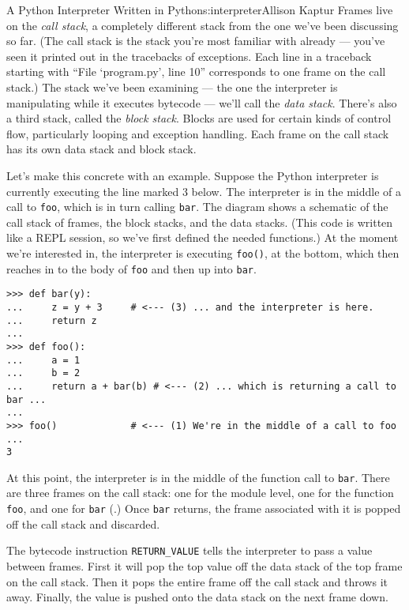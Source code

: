 \begin{aosachapter}{A Python Interpreter Written in Python}{s:interpreter}{Allison Kaptur}
Frames live on the \emph{call stack}, a completely different stack from
the one we've been discussing so far. (The call stack is the stack
you're most familiar with already --- you've seen it printed out in the
tracebacks of exceptions. Each line in a traceback starting with ``File
`program.py', line 10'' corresponds to one frame on the call stack.) The
stack we've been examining --- the one the interpreter is manipulating
while it executes bytecode --- we'll call the \emph{data stack}. There's
also a third stack, called the \emph{block stack}. Blocks are used for
certain kinds of control flow, particularly looping and exception
handling. Each frame on the call stack has its own data stack and block
stack.

Let's make this concrete with an example. Suppose the Python interpreter
is currently executing the line marked 3 below. The interpreter is in
the middle of a call to \texttt{foo}, which is in turn calling
\texttt{bar}. The diagram shows a schematic of the call stack of frames,
the block stacks, and the data stacks. (This code is written like a REPL
session, so we've first defined the needed functions.) At the moment
we're interested in, the interpreter is executing \texttt{foo()}, at the
bottom, which then reaches in to the body of \texttt{foo} and then up
into \texttt{bar}.

\begin{verbatim}
>>> def bar(y):
...     z = y + 3     # <--- (3) ... and the interpreter is here.
...     return z
...
>>> def foo():
...     a = 1
...     b = 2
...     return a + bar(b) # <--- (2) ... which is returning a call to bar ...
...
>>> foo()             # <--- (1) We're in the middle of a call to foo ...
3
\end{verbatim}


At this point, the interpreter is in the middle of the function call to
\texttt{bar}. There are three frames on the call stack: one for the
module level, one for the function \texttt{foo}, and one for
\texttt{bar} (.) Once
\texttt{bar} returns, the frame associated with it is popped off the
call stack and discarded.

The bytecode instruction \texttt{RETURN\_VALUE} tells the interpreter to
pass a value between frames. First it will pop the top value off the
data stack of the top frame on the call stack. Then it pops the entire
frame off the call stack and throws it away. Finally, the value is
pushed onto the data stack on the next frame down.


\end{aosachapter}
